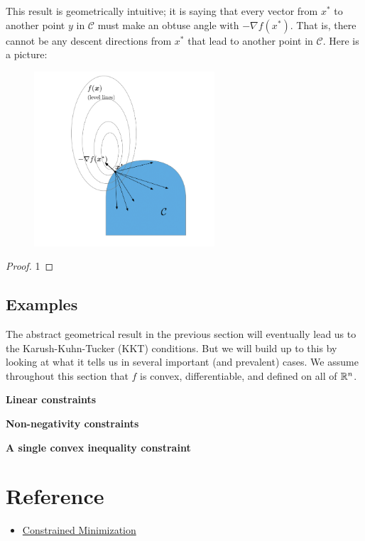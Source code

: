 \begin{remark}
    This result is geometrically intuitive; it is saying that every vector
    from $x^*$ to another point $y$ in
    $\mathcal{C}$ must make an obtuse
    angle with $-\nabla f(x^*)$. That is, there cannot be any descent directions from
    $x^*$ that lead to another point in
    $\mathcal{C}$. Here is a picture:
\end{remark}
\begin{figure}[htbp]
    \centering
    \includegraphics[width=0.6\textwidth]{figure/cp_opt_con.png}
    \caption{}
\end{figure}

\begin{proof}
    1
\end{proof}

\subsection{Examples}
The abstract geometrical result in the previous section will eventually
lead us to the Karush-Kuhn-Tucker (KKT) conditions. But we will
build up to this by looking at what it tells us in several important
(and prevalent) cases.
We assume throughout this section that $f$ is convex, differentiable,
and defined on all of $\mathbb{R}^n$.
\par
\noindent\bf{Linear constraints}

\noindent\bf{Non-negativity constraints}

\noindent\bf{A single convex inequality constraint}



\section{Reference}



\begin{itemize}
    \item \href{https://sites.gatech.edu/ece-6270-fall-2022/}{Constrained Minimization}
\end{itemize}